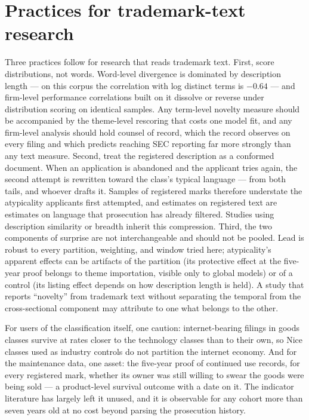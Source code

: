 \section{Practices for trademark-text research}\label{sec:practices}

Three practices follow for research that reads trademark text. First,
score distributions, not words. Word-level divergence is dominated by
description length --- on this corpus the correlation with log distinct
terms is $-0.64$ --- and firm-level performance correlations built
on it dissolve or reverse under distribution scoring on identical
samples. Any term-level novelty measure should be accompanied by the
theme-level rescoring that costs one model fit, and any firm-level
analysis should hold counsel of record, which the record observes on
every filing and which predicts reaching SEC reporting far more strongly
than any text measure. Second, treat the
registered description as a conformed document. When an application is
abandoned and the applicant tries again, the second attempt is rewritten
toward the class's typical language --- from both tails, and whoever
drafts it. Samples of registered marks therefore understate the
atypicality applicants first attempted, and estimates on registered text
are estimates on language that prosecution has already filtered. Studies using description
similarity or breadth inherit this compression. Third, the two components
of surprise are not interchangeable and should not be pooled. Lead is
robust to every partition, weighting, and window tried here;
atypicality's apparent effects can be artifacts of the partition (its
protective effect at the five-year proof belongs to theme importation,
visible only to global models) or of a control (its listing effect
depends on how description length is held). A study that reports
``novelty'' from trademark text without separating the temporal from the
cross-sectional component may attribute to one what belongs to the other.

For users of the classification itself, one caution: internet-bearing
filings in goods classes survive at rates closer to the technology
classes than to their own, so Nice classes used as industry controls do
not partition the internet economy. And for the maintenance data, one
asset: the five-year proof of continued use records, for every
registered mark, whether its owner was still willing to swear the goods
were being sold --- a product-level survival outcome with a date on it.
The indicator literature has largely left it unused, and it is
observable for any cohort more than seven years old at no cost beyond
parsing the prosecution history.
